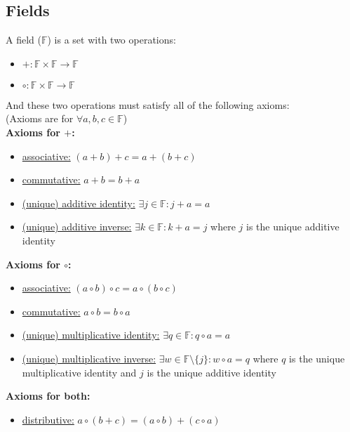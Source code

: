 \documentclass[12pt]{article}
\begin{document}
\subsection{Fields}

\begin{tcolorbox}[title=Fields]
	A field ($\mathbb{F}$) is a set with two operations:
	\begin{itemize}
		\item{$+:\mathbb{F} \times \mathbb{F} \longrightarrow \mathbb{F}$}
		\item{$\circ:\mathbb{F} \times \mathbb{F} \longrightarrow \mathbb{F}$}
	\end{itemize}
	And these two operations must satisfy all of the following axioms:\\
	(Axioms are for $\forall a,b,c \in \mathbb{F}$)\\
	\textbf{Axioms for $+$:}
	\begin{itemize}
		\item{\underline{associative:} $(a + b) + c = a + (b + c)$}
		\item{\underline{commutative:} $a + b = b + a$}
		\item{\underline{(unique) additive identity:} $\exists j \in \mathbb{F} : j + a = a$}
		\item{\underline{(unique) additive inverse:} $\exists k \in \mathbb{F} : k + a = j$ where $j$ is the unique additive identity}
	\end{itemize}
	\textbf{Axioms for $\circ$:}
	\begin{itemize}
		\item{\underline{associative:} $(a \circ b) \circ c = a \circ (b \circ c)$}
		\item{\underline{commutative:} $a \circ b = b \circ a$}
		\item{\underline{(unique) multiplicative identity:} $\exists q \in \mathbb{F} : q \circ a = a$}
		\item{\underline{(unique) multiplicative inverse:} $\exists w \in \mathbb{F}\setminus\{ j \} : w \circ a = q$ where $q$ is the unique multiplicative identity and $j$ is the unique additive identity}
	\end{itemize}
	\textbf{Axioms for both:}
	\begin{itemize}
		\item{\underline{distributive:} $a \circ (b + c) = (a \circ b) + (c \circ a)$}
	\end{itemize}
\end{tcolorbox}
\end{document}
